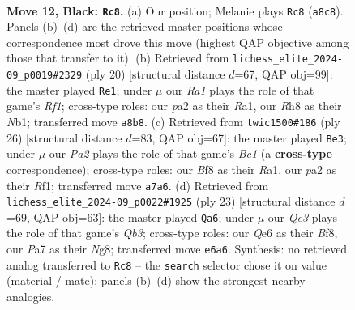 \documentclass[11pt]{article}
\begin{document}
\clearpage

\begin{figure}[p]\centering
\begin{subfigure}{0.46\textwidth}\centering
\resizebox{\linewidth}{!}{%
\newchessgame
\chessboard[
  setfen={r3kbnr/pbpp1ppp/4q3/4P3/2p2PPP/2P4R/PP2Q3/RNB1KB2 b Qkq - 2 12},
  showmover=false,
  pgfstyle=straightmove, color=movearrow, markmove={a8-c8}
]}
\caption{}
\end{subfigure}\hfill
\begin{subfigure}{0.46\textwidth}\centering
\resizebox{\linewidth}{!}{%
\newchessgame
\chessboard[
  setfen={r3kbnr/2pq1pp1/p1pp4/4P2p/3p4/5Q1P/PPP2PP1/RNB2RK1 w kq - 1 11},
  showmover=false,
  pgfstyle=straightmove, color=movearrow, markmove={f1-e1}
]}
\caption{}
\end{subfigure}
\\[4pt]
\begin{subfigure}{0.46\textwidth}\centering
\resizebox{\linewidth}{!}{%
\newchessgame
\chessboard[
  setfen={r2qk2r/1b2bppp/p3p3/1p1pP3/8/1Q4P1/PP2PPBP/R1B2RK1 w kq - 0 14},
  showmover=false,
  pgfstyle=straightmove, color=movearrow, markmove={c1-e3}
]}
\caption{}
\end{subfigure}\hfill
\begin{subfigure}{0.46\textwidth}\centering
\resizebox{\linewidth}{!}{%
\newchessgame
\chessboard[
  setfen={2r1kbnr/pp1b1ppp/1q2p3/4P3/1PpP4/P4N2/1B3PPP/2RQKB1R b Kk - 1 12},
  showmover=false,
  pgfstyle=straightmove, color=movearrow, markmove={b6-a6}
]}
\caption{}
\end{subfigure}
\caption{\textbf{Move 12, Black: \texttt{Rc8}.} (a) Our position; Melanie plays \texttt{Rc8} (\texttt{a8c8}). Panels (b)--(d) are the retrieved master positions whose correspondence most drove this move (highest QAP objective among those that transfer to it). (b) Retrieved from \texttt{lichess\_elite\_2024-09\_p0019\#2329} (ply 20) [structural distance $d$=67, QAP obj=99]: the master played \texttt{Re1}; under $\mu$ our \emph{Ra1} plays the role of that game's \emph{Rf1}; cross-type roles: our \emph{p}a2 as their \emph{R}a1, our \emph{R}h8 as their \emph{N}b1; transferred move \texttt{a8b8}. (c) Retrieved from \texttt{twic1500\#186} (ply 26) [structural distance $d$=83, QAP obj=67]: the master played \texttt{Be3}; under $\mu$ our \emph{Pa2} plays the role of that game's \emph{Bc1} (a \textbf{cross-type} correspondence); cross-type roles: our \emph{B}f8 as their \emph{R}a1, our \emph{p}a2 as their \emph{R}f1; transferred move \texttt{a7a6}. (d) Retrieved from \texttt{lichess\_elite\_2024-09\_p0022\#1925} (ply 23) [structural distance $d$=69, QAP obj=63]: the master played \texttt{Qa6}; under $\mu$ our \emph{Qe3} plays the role of that game's \emph{Qb3}; cross-type roles: our \emph{Q}e6 as their \emph{B}f8, our \emph{P}a7 as their \emph{N}g8; transferred move \texttt{e6a6}. Synthesis: no retrieved analog transferred to \texttt{Rc8} -- the \texttt{search} selector chose it on value (material / mate); panels (b)--(d) show the strongest nearby analogies.}
\label{fig:thought-m23}
\end{figure}
\end{document}
